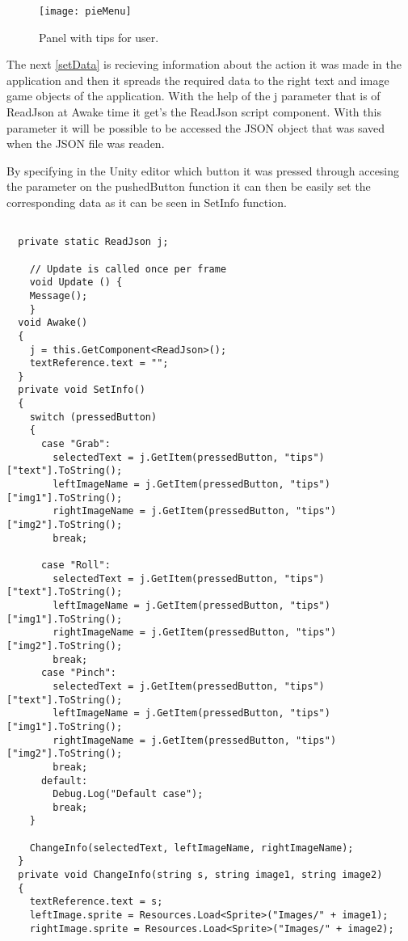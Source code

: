 { 

 
\begin{figure}[!h]
\centering
\texttt{[image: pieMenu]}
\caption{Panel with tips for user. }\label{pieMenu}
\end{figure}




The next \autoref{setData} is recieving information about the action it was made in the application and then it spreads the required data to the right text and image game objects of the application. With the help of the j parameter that is of ReadJson at Awake time it get's the ReadJson script component. With this parameter it will be possible to be accessed the JSON object that was saved when the JSON file was readen.

By specifying in the Unity editor which button it was pressed through accesing the parameter on the pushedButton function it can then be easily set the corresponding data as it can be seen in SetInfo function.
\begin{lstlisting}[caption={Data popularization},label={setData}]

  private static ReadJson j;

	// Update is called once per frame
	void Update () {
    Message();
	}
  void Awake()
  {
    j = this.GetComponent<ReadJson>();
    textReference.text = "";
  }
  private void SetInfo()
  {
    switch (pressedButton)
    {
      case "Grab":
        selectedText = j.GetItem(pressedButton, "tips")["text"].ToString();
        leftImageName = j.GetItem(pressedButton, "tips")["img1"].ToString();
        rightImageName = j.GetItem(pressedButton, "tips")["img2"].ToString();
        break;

      case "Roll":
        selectedText = j.GetItem(pressedButton, "tips")["text"].ToString();
        leftImageName = j.GetItem(pressedButton, "tips")["img1"].ToString();
        rightImageName = j.GetItem(pressedButton, "tips")["img2"].ToString();
        break;
      case "Pinch":
        selectedText = j.GetItem(pressedButton, "tips")["text"].ToString();
        leftImageName = j.GetItem(pressedButton, "tips")["img1"].ToString();
        rightImageName = j.GetItem(pressedButton, "tips")["img2"].ToString();
        break;
      default:
        Debug.Log("Default case");
        break;
    }

    ChangeInfo(selectedText, leftImageName, rightImageName);
  }
  private void ChangeInfo(string s, string image1, string image2)
  {
    textReference.text = s;
    leftImage.sprite = Resources.Load<Sprite>("Images/" + image1);
    rightImage.sprite = Resources.Load<Sprite>("Images/" + image2);


\end{lstlisting}}
